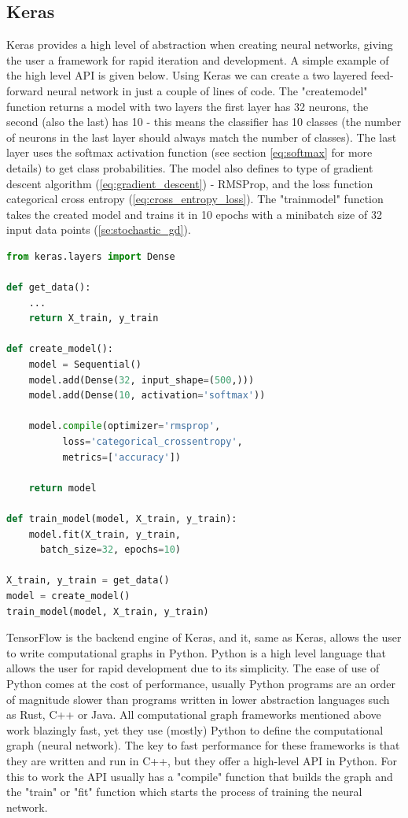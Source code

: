 \documentclass[times, utf8, diplomski]{fer}
\begin{document}
\subsection{Keras}
\label{se:keras}

Keras provides a high level of abstraction when creating neural networks, giving the user a framework for rapid iteration and development. A simple example of the high level API is given below. Using Keras we can create a two layered feed-forward neural network in just a couple of lines of code. The "create\textunderscore model" function returns a model with two layers the first layer has 32 neurons, the second (also the last) has 10 - this means the classifier has 10 classes (the number of neurons in the last layer should always match the number of classes). The last layer uses the softmax activation function (see section \ref{eq:softmax} for more details) to get class probabilities. The model also defines to type of gradient descent algorithm (\ref{eq:gradient_descent}) - RMSProp, and the loss function categorical cross entropy (\ref{eq:cross_entropy_loss}). The "train\textunderscore model" function takes the created model and trains it in 10 epochs with a minibatch size of 32 input data points (\ref{se:stochastic_gd}).



\begin{lstlisting}[language=Python, caption=Keras high level API example]
from keras.layers import Dense

def get_data():
	...
	return X_train, y_train

def create_model():
    model = Sequential()
    model.add(Dense(32, input_shape=(500,)))
    model.add(Dense(10, activation='softmax'))
    
    model.compile(optimizer='rmsprop',
          loss='categorical_crossentropy',
          metrics=['accuracy'])
          
    return model
    
def train_model(model, X_train, y_train):
	model.fit(X_train, y_train,
	  batch_size=32, epochs=10)
        
X_train, y_train = get_data()
model = create_model()
train_model(model, X_train, y_train)

\end{lstlisting}

TensorFlow is the backend engine of Keras, and it, same as Keras, allows the user to write computational graphs in Python. Python is a high level language that allows the user for rapid development due to its simplicity. The ease of use of Python comes at the cost of performance, usually Python programs are an order of magnitude slower than programs written in lower abstraction languages such as Rust, C++ or Java. All computational graph frameworks mentioned above work blazingly fast, yet they use (mostly) Python to define the computational graph (neural network). The key to fast performance for these frameworks is that they are written and run in C++, but they offer a high-level API in Python. For this to work the API usually has a "compile" function that builds the graph and the "train" or "fit" function which starts the process of training the neural network.
\end{document}
